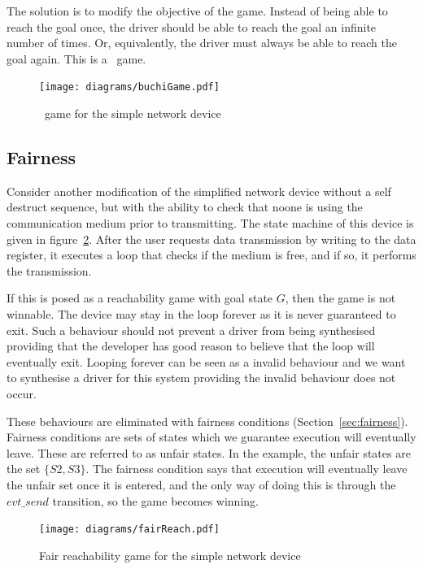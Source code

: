 The solution is to modify the objective of the game. Instead of being able to reach the goal once, the driver should be able to reach the goal an infinite number of times. Or, equivalently, the driver must always be able to reach the goal again. This is a \buchi\ game.

\begin{figure}
\centering
\texttt{[image: diagrams/buchiGame.pdf]}
\caption{\buchi\ game for the simple network device}
\label{fig:buchi}
\end{figure}

\subsection{Fairness}
\label{sec:game_fairness}

Consider another modification of the simplified network device without a self destruct sequence, but with the ability to check that noone is using the communication medium prior to transmitting. The state machine of this device is given in figure~\ref{fig:fair}. After the user requests data transmission by writing to the data register, it executes a loop that checks if the medium is free, and if so, it performs the transmission. 

If this is posed as a reachability game with goal state $G$, then the game is not winnable. The device may stay in the loop forever as it is never guaranteed to exit. Such a behaviour should not prevent a driver from being synthesised providing that the developer has good reason to believe that the loop will eventually exit. Looping forever can be seen as a invalid behaviour and we want to synthesise a driver for this system providing the invalid behaviour does not occur. 

These behaviours are eliminated with fairness conditions (Section~\ref{sec:fairness}). Fairness conditions are sets of states which we guarantee execution will eventually leave. These are referred to as unfair states. In the example, the unfair states are the set $\{S2, S3\}$. The fairness condition says that execution will eventually leave the unfair set once it is entered, and the only way of doing this is through the $evt\_send$ transition, so the game becomes winning.

\begin{figure}[t]
\centering
\texttt{[image: diagrams/fairReach.pdf]}
\caption{Fair reachability game for the simple network device}
\label{fig:fair}
\end{figure}


